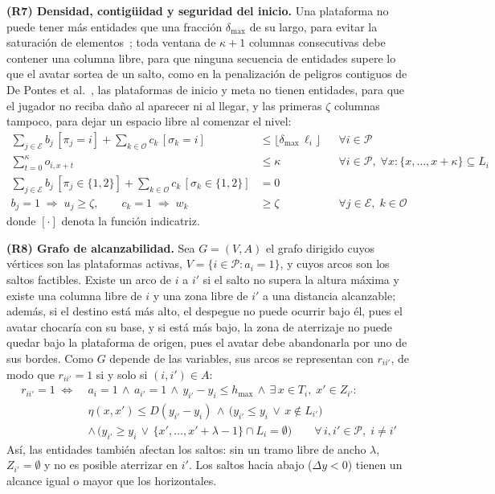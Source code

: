 \documentclass[letter, 10pt]{article}
\begin{document}
\textbf{(R7) Densidad, contig\"uidad y seguridad del inicio.} Una plataforma no puede tener m\'as entidades que una fracci\'on $\delta_{\max}$ de su largo, para evitar la saturaci\'on de elementos~\cite{Saavedra2026}; toda ventana de $\kappa+1$ columnas consecutivas debe contener una columna libre, para que ninguna secuencia de entidades supere lo que el avatar sortea de un salto, como en la penalizaci\'on de peligros contiguos de De Pontes et al.~\cite{DePontes2022}, las plataformas de inicio y meta no tienen entidades, para que el jugador no reciba da\~no al aparecer ni al llegar, y las primeras $\zeta$ columnas tampoco, para dejar un espacio libre al comenzar el nivel:
\begin{align}
\sum_{j\in\mathcal{E}} b_j\,[\pi_j = i] + \sum_{k\in\mathcal{O}} c_k\,[\sigma_k = i] &\leq \lfloor \delta_{\max}\,\ell_i \rfloor && \forall i \in \mathcal{P} \\
\sum_{t=0}^{\kappa} o_{i,x+t} &\leq \kappa && \forall i \in \mathcal{P},\; \forall x : \{x,\dots,x+\kappa\} \subseteq L_i \\
\sum_{j\in\mathcal{E}} b_j\,[\pi_j \in \{1,2\}] + \sum_{k\in\mathcal{O}} c_k\,[\sigma_k \in \{1,2\}] &= 0 \\
b_j = 1 \;\Rightarrow\; u_j \geq \zeta, \qquad c_k = 1 \;\Rightarrow\; w_k &\geq \zeta && \forall j \in \mathcal{E},\; k \in \mathcal{O}
\end{align}
donde $[\cdot]$ denota la funci\'on indicatriz.

\textbf{(R8) Grafo de alcanzabilidad.} Sea $G = (V, A)$ el grafo dirigido cuyos v\'ertices son las plataformas activas, $V = \{ i \in \mathcal{P} : a_i = 1\}$, y cuyos arcos son los saltos factibles. Existe un arco de $i$ a $i'$ si el salto no supera la altura m\'axima y existe una columna libre de $i$ y una zona libre de $i'$ a una distancia alcanzable; adem\'as, si el destino est\'a m\'as alto, el despegue no puede ocurrir bajo \'el, pues el avatar chocar\'ia con su base, y si est\'a m\'as bajo, la zona de aterrizaje no puede quedar bajo la plataforma de origen, pues el avatar debe abandonarla por uno de sus bordes. Como $G$ depende de las variables, sus arcos se representan con $r_{ii'}$, de modo que $r_{ii'} = 1$ si y solo si $(i,i') \in A$:
\begin{equation}
\begin{aligned}
r_{ii'} = 1 \;\iff\; & a_i = 1 \,\wedge\, a_{i'} = 1 \,\wedge\, y_{i'} - y_i \leq h_{\max} \,\wedge\, \exists\, x \in T_i,\; x' \in Z_{i'} : \\
& \eta(x,x') \leq D(y_{i'} - y_i) \,\wedge\, \big(y_{i'} \leq y_i \,\vee\, x \notin L_{i'}\big) \\ & \wedge\, \big(y_{i'} \geq y_i \,\vee\, \{x',\dots,x'+\lambda-1\} \cap L_i = \emptyset\big) \qquad \forall\, i, i' \in \mathcal{P},\; i \neq i'
\end{aligned}
\end{equation}
As\'i, las entidades tambi\'en afectan los saltos: sin un tramo libre de ancho $\lambda$, $Z_{i'} = \emptyset$ y no es posible aterrizar en $i'$. Los saltos hacia abajo ($\Delta y < 0$) tienen un alcance igual o mayor que los horizontales.
\end{document}
